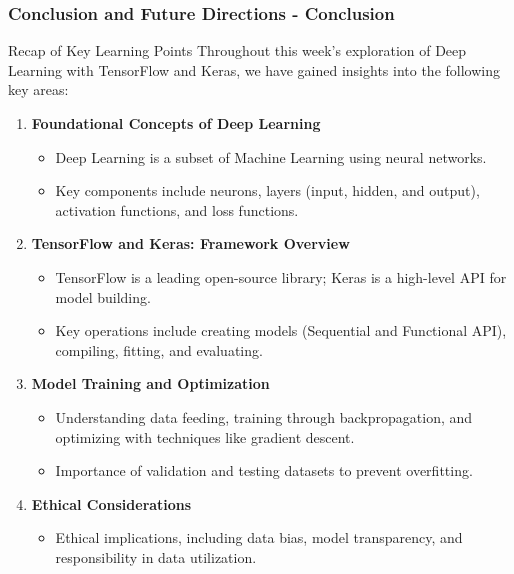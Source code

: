 \documentclass[aspectratio=169]{beamer}
\begin{document}
\begin{frame}[fragile]
    \frametitle{Conclusion and Future Directions - Conclusion}
    \begin{block}{Recap of Key Learning Points}
        Throughout this week’s exploration of Deep Learning with TensorFlow and Keras, we have gained insights into the following key areas:
    \end{block}
    \begin{enumerate}
        \item \textbf{Foundational Concepts of Deep Learning}
        \begin{itemize}
            \item Deep Learning is a subset of Machine Learning using neural networks.
            \item Key components include neurons, layers (input, hidden, and output), activation functions, and loss functions.
        \end{itemize}

        \item \textbf{TensorFlow and Keras: Framework Overview}
        \begin{itemize}
            \item TensorFlow is a leading open-source library; Keras is a high-level API for model building.
            \item Key operations include creating models (Sequential and Functional API), compiling, fitting, and evaluating.
        \end{itemize}

        \item \textbf{Model Training and Optimization}
        \begin{itemize}
            \item Understanding data feeding, training through backpropagation, and optimizing with techniques like gradient descent.
            \item Importance of validation and testing datasets to prevent overfitting.
        \end{itemize}

        \item \textbf{Ethical Considerations}
        \begin{itemize}
            \item Ethical implications, including data bias, model transparency, and responsibility in data utilization.
        \end{itemize}
    \end{enumerate}
\end{frame}
\end{document}
